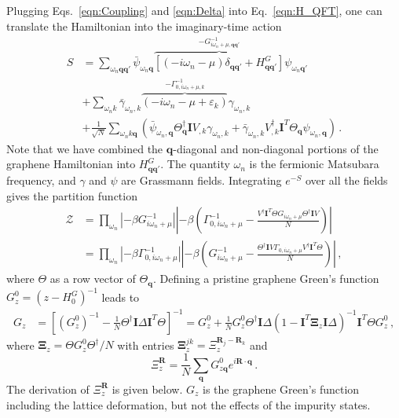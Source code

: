 \documentclass[aps,prb,superscriptaddress,preprint,floatfix]{revtex4-1}
\begin{document}
Plugging Eqs.~\eqref{eqn:Coupling} and \eqref{eqn:Delta} into Eq.~\eqref{eqn:H_QFT}, one can translate the Hamiltonian into the imaginary-time action
%
\begin{align}
    S &= \sum_{\omega_n\mathbf{qq}'} \bar\psi_{\omega_n\mathbf{q}}
    \overbrace{
    \left[\left(-i\omega_n-\mu\right) \delta_{\mathbf{qq}'}
    + 
    H^G_{\mathbf{qq}'} \right]}^{-G^{-1}_{i\omega_n + \mu, \mathbf{qq}'}}
    \psi_{\omega_n\mathbf{q}'}
    \nonumber
    \\
    &
    +
    \sum_{\omega_n k}\bar\gamma_{\omega_n,k} 
    \overbrace{\left(-i\omega_n - \mu + \varepsilon_k \right)}^{-\Gamma_{0,i\omega_n + \mu, k}^{-1}} \gamma_{\omega_n,k}
    \nonumber
    \\
    &
    +
    \frac{1}{\sqrt{N}}\sum_{\omega_n k \mathbf{q}} 
    \left(
    \bar\psi_{\omega_n,\mathbf{q}}
    \Theta_\mathbf{q}^\dagger
    \mathbf{I}V_{,k}
    \gamma_{\omega_n,k}+
    \bar\gamma_{\omega_n,k} 
    V_{,k}^\dagger\mathbf{I}^T\Theta_\mathbf{q}
    \psi_{\omega_n,\mathbf{q}}
    \right)\,.
    \label{eqn:S}
\end{align}
%
Note that we have combined the $\mathbf{q}$-diagonal and non-diagonal portions of the graphene Hamiltonian into $ H^G_{\mathbf{qq}'}$. The quantity $\omega_n$ is the fermionic Matsubara frequency, and $\gamma$ and $\psi$ are Grassmann fields. Integrating $e^{-S}$ over all the fields gives the partition function
%
\begin{align}
    \mathcal{Z} &= 
    \prod_{\omega_n }
    \left|-\beta G^{-1}_{i\omega_n+\mu}\right|
    \left|-\beta\left(\Gamma^{-1}_{0,i\omega_n+\mu} - \frac{V^\dagger \mathbf{I}^T\Theta  G_{i\omega_n+\mu} \Theta^\dagger \mathbf{I} V}{N}\right)\right|
    \nonumber
    \\
    &= 
    \prod_{\omega_n }
    \left|-\beta \Gamma^{-1}_{0,i\omega_n+\mu}\right|
    \left|-\beta\left( G_{i\omega_n+\mu} ^{-1} -  \frac{\Theta^\dagger\mathbf{I}V\Gamma_{0,i\omega_n+\mu}V^\dagger \mathbf{I}^T\Theta  }{N}\right)\right|\,,
    \label{eqn:Z}
\end{align}
%
where $\Theta$ as a row vector of $\Theta_\mathbf{q}$. Defining a pristine graphene Green's function $G_{z}^0 = \left(z - H^G_0\right)^{-1}$ leads to
%
\begin{align}
	G_{z} &= \left[\left(G_{z}^0\right)^{-1} - \frac{1}{N} \Theta^\dagger\mathbf{I}\Delta \mathbf{I}^T\Theta\right]^{-1}
	=
	G_{z}^0
	+
	\frac{1}{N} G_{z}^0\Theta^\dagger\mathbf{I}\Delta
	\left( 1
	-
	\mathbf{I}^T\boldsymbol{\Xi}_{z}\mathbf{I}\Delta 
	\right)^{-1}\mathbf{I}^T\Theta G_{z}^0\,,	
\end{align}
%
where $\boldsymbol{\Xi}_{z} = \Theta G_{z}^0\Theta^\dagger / N$ with entries $\boldsymbol{\Xi}_{z}^{jk} = \Xi_{z}^{\mathbf{R}_j - \mathbf{R}_k}$ and
%
\begin{equation}
    \Xi_z^\mathbf{R} = \frac{1}{N}\sum_\mathbf{q}G_{z\mathbf{q}}^0
    e^{i \mathbf{R} \cdot\mathbf{q}}\,.
    \label{eqn:Xi}
\end{equation}
%
The derivation of $\Xi_z^\mathbf{R}$ is given below. $G_z$ is the graphene Green's function including the lattice deformation, but not the effects of the impurity states.
\end{document}
